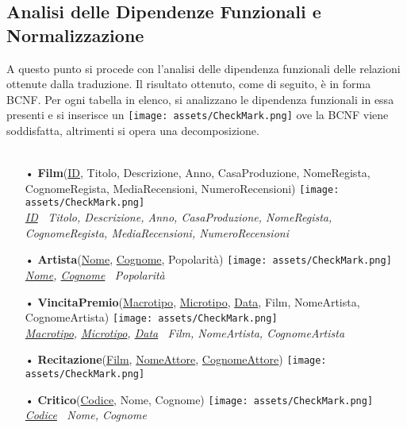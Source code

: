 \documentclass{article}
\begin{document}
\subsection{Analisi delle Dipendenze Funzionali e Normalizzazione}
A questo punto si procede con l'analisi delle dipendenza funzionali delle relazioni ottenute dalla traduzione. Il risultato ottenuto, come di seguito, è in forma BCNF. Per ogni tabella in elenco, si analizzano le dipendenza funzionali in essa presenti e si inserisce un \texttt{[image: assets/CheckMark.png]} ove la BCNF viene soddisfatta, altrimenti si opera una decomposizione. \\ \\
\begin{itemize}

    \item[•] \textbf{Film}(\underline{ID}, Titolo, Descrizione, Anno, CasaProduzione, NomeRegista, CognomeRegista, MediaRecensioni, NumeroRecensioni) \texttt{[image: assets/CheckMark.png]} \\
    {\small \textit{\underline{ID} \textrightarrow\, Titolo, Descrizione, Anno, CasaProduzione, NomeRegista, \\ CognomeRegista, MediaRecensioni, NumeroRecensioni}} 

    \item[•] \textbf{Artista}(\underline{Nome}, \underline{Cognome}, Popolarità) \texttt{[image: assets/CheckMark.png]} \\ 
    {\small \textit{\underline{Nome}, \underline{Cognome} \textrightarrow\, Popolarità}} 
    
    \item[•] \textbf{VincitaPremio}(\underline{Macrotipo}, \underline{Microtipo}, \underline{Data}, Film, NomeArtista, CognomeArtista) \texttt{[image: assets/CheckMark.png]} \\
    {\small \textit{\underline{Macrotipo}, \underline{Microtipo}, \underline{Data} \textrightarrow\, Film, NomeArtista, CognomeArtista}} 
    
    \item[•] \textbf{Recitazione}(\underline{Film}, \underline{NomeAttore}, \underline{CognomeAttore}) \texttt{[image: assets/CheckMark.png]}
    
    \item[•] \textbf{Critico}(\underline{Codice}, Nome, Cognome) \texttt{[image: assets/CheckMark.png]} \\ 
    {\small \textit{\underline{Codice} \textrightarrow\, Nome, Cognome}} 
    

\end{itemize}
\end{document}
